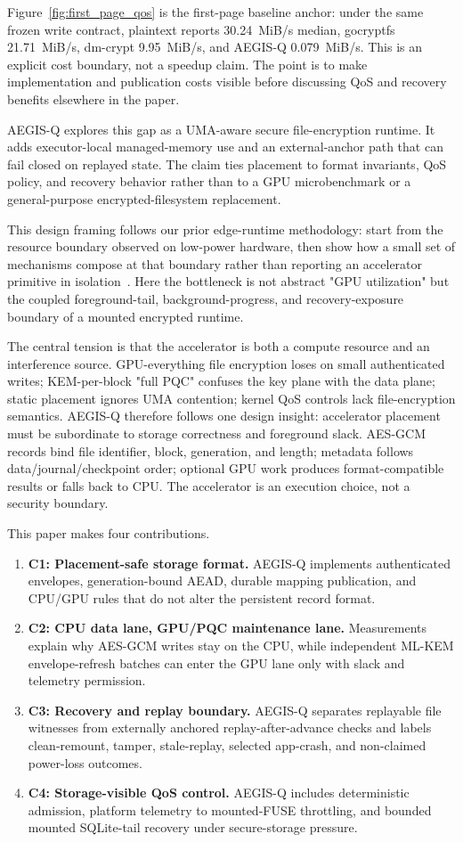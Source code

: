Figure~\ref{fig:first_page_qos} is the first-page baseline anchor: under the same frozen write contract, plaintext reports 30.24~MiB/s median, gocryptfs 21.71~MiB/s, dm-crypt 9.95~MiB/s, and AEGIS-Q 0.079~MiB/s.  This is an explicit cost boundary, not a speedup claim.  The point is to make implementation and publication costs visible before discussing QoS and recovery benefits elsewhere in the paper.

AEGIS-Q explores this gap as a UMA-aware secure file-encryption runtime.  It adds executor-local managed-memory use and an external-anchor path that can fail closed on replayed state.  The claim ties placement to format invariants, QoS policy, and recovery behavior rather than to a GPU microbenchmark or a general-purpose encrypted-filesystem replacement.

This design framing follows our prior edge-runtime methodology: start from the resource boundary observed on low-power hardware, then show how a small set of mechanisms compose at that boundary rather than reporting an accelerator primitive in isolation~\cite{edgeqsim}.  Here the bottleneck is not abstract "GPU utilization" but the coupled foreground-tail, background-progress, and recovery-exposure boundary of a mounted encrypted runtime.

The central tension is that the accelerator is both a compute resource and an interference source.  GPU-everything file encryption loses on small authenticated writes; KEM-per-block "full PQC" confuses the key plane with the data plane; static placement ignores UMA contention; kernel QoS controls lack file-encryption semantics.  AEGIS-Q therefore follows one design insight: accelerator placement must be subordinate to storage correctness and foreground slack.  AES-GCM records bind file identifier, block, generation, and length; metadata follows data/journal/checkpoint order; optional GPU work produces format-compatible results or falls back to CPU.  The accelerator is an execution choice, not a security boundary.

This paper makes four contributions.
\begin{enumerate}
\item \textbf{C1: Placement-safe storage format.}  AEGIS-Q implements authenticated envelopes, generation-bound AEAD, durable mapping publication, and CPU/GPU rules that do not alter the persistent record format.
\item \textbf{C2: CPU data lane, GPU/PQC maintenance lane.}  Measurements explain why AES-GCM writes stay on the CPU, while independent ML-KEM envelope-refresh batches can enter the GPU lane only with slack and telemetry permission.
\item \textbf{C3: Recovery and replay boundary.}  AEGIS-Q separates replayable file witnesses from externally anchored replay-after-advance checks and labels clean-remount, tamper, stale-replay, selected app-crash, and non-claimed power-loss outcomes.
\item \textbf{C4: Storage-visible QoS control.}  AEGIS-Q includes deterministic admission, platform telemetry to mounted-FUSE throttling, and bounded mounted SQLite-tail recovery under secure-storage pressure.
\end{enumerate}

